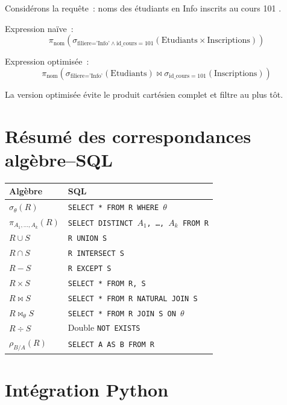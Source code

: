 \begin{exemple}
Consid\'erons la requ\^ete~: \og noms des \'etudiants en Info inscrits au cours 101 \fg.

Expression na\"ive~:
\[
\pi_{\text{nom}}(\sigma_{\text{filiere='Info'} \land \text{id\_cours}=101}(\text{Etudiants} \times \text{Inscriptions}))
\]

Expression optimis\'ee~:
\[
\pi_{\text{nom}}(\sigma_{\text{filiere='Info'}}(\text{Etudiants}) \bowtie \sigma_{\text{id\_cours}=101}(\text{Inscriptions}))
\]

La version optimis\'ee \'evite le produit cart\'esien complet et filtre au plus t\^ot.
\end{exemple}

\section{R\'esum\'e des correspondances alg\`ebre--SQL}

\begin{formules}[title=\textbf{Correspondance Alg\`ebre Relationnelle $\leftrightarrow$ SQL}]
\begin{center}
\begin{tabular}{ll}
\toprule
\textbf{Alg\`ebre} & \textbf{SQL} \\
\midrule
$\sigma_\theta(R)$ & \texttt{SELECT * FROM R WHERE $\theta$} \\
$\pi_{A_1,\ldots,A_k}(R)$ & \texttt{SELECT DISTINCT $A_1$, \ldots, $A_k$ FROM R} \\
$R \cup S$ & \texttt{R UNION S} \\
$R \cap S$ & \texttt{R INTERSECT S} \\
$R - S$ & \texttt{R EXCEPT S} \\
$R \times S$ & \texttt{SELECT * FROM R, S} \\
$R \bowtie S$ & \texttt{SELECT * FROM R NATURAL JOIN S} \\
$R \bowtie_\theta S$ & \texttt{SELECT * FROM R JOIN S ON $\theta$} \\
$R \div S$ & Double \texttt{NOT EXISTS} \\
$\rho_{B/A}(R)$ & \texttt{SELECT A AS B FROM R} \\
\bottomrule
\end{tabular}
\end{center}
\end{formules}

\section{Int\'egration Python}

